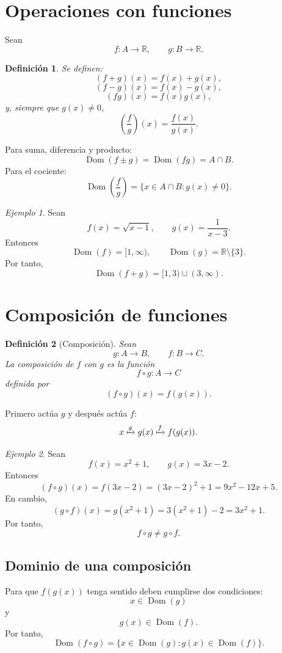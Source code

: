 \documentclass[12pt]{article}
\newtheorem{definicion}{Definición}[section]
\theoremstyle{remark}
\newtheorem{ejemplo}{Ejemplo}[section]
\newcommand{\R}{\mathbb{R}}
\newcommand{\Dom}{\operatorname{Dom}}
\begin{document}
\section{Operaciones con funciones}

Sean
\[
f:A\to\R,\qquad g:B\to\R.
\]

\begin{definicion}
Se definen:
\[
(f+g)(x)=f(x)+g(x),
\]
\[
(f-g)(x)=f(x)-g(x),
\]
\[
(fg)(x)=f(x)g(x),
\]
y, siempre que $g(x)\neq0$,
\[
\left(\frac{f}{g}\right)(x)=\frac{f(x)}{g(x)}.
\]
\end{definicion}

Para suma, diferencia y producto:
\[
\Dom(f\pm g)=\Dom(fg)=A\cap B.
\]
Para el cociente:
\[
\Dom\left(\frac fg\right)
=\{x\in A\cap B:g(x)\neq0\}.
\]

\begin{ejemplo}
Sean
\[
f(x)=\sqrt{x-1},
\qquad
g(x)=\frac{1}{x-3}.
\]
Entonces
\[
\Dom(f)=[1,\infty),
\qquad
\Dom(g)=\R\setminus\{3\}.
\]
Por tanto,
\[
\Dom(f+g)=[1,3)\cup(3,\infty).
\]
\end{ejemplo}

\section{Composición de funciones}

\begin{definicion}[Composición]
Sean
\[
g:A\to B,\qquad f:B\to C.
\]
La composición de $f$ con $g$ es la función
\[
f\circ g:A\to C
\]
definida por
\[
(f\circ g)(x)=f(g(x)).
\]
\end{definicion}

Primero actúa $g$ y después actúa $f$:
\[
x\xmapsto{g}g(x)\xmapsto{f}f(g(x)).
\]

\begin{ejemplo}
Sean
\[
f(x)=x^2+1,\qquad g(x)=3x-2.
\]
Entonces
\[
(f\circ g)(x)
=f(3x-2)
=(3x-2)^2+1
=9x^2-12x+5.
\]
En cambio,
\[
(g\circ f)(x)
=g(x^2+1)
=3(x^2+1)-2
=3x^2+1.
\]
Por tanto,
\[
f\circ g\neq g\circ f.
\]
\end{ejemplo}

\subsection*{Dominio de una composición}

Para que $f(g(x))$ tenga sentido deben cumplirse dos condiciones:
\[
x\in\Dom(g)
\]
y
\[
g(x)\in\Dom(f).
\]
Por tanto,
\[
\Dom(f\circ g)
=
\{x\in\Dom(g):g(x)\in\Dom(f)\}.
\]
\end{document}
